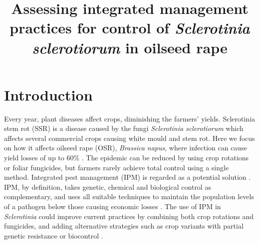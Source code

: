 \documentclass{article}
\title{\vspace*{-22mm}\bf Assessing integrated management practices for control of \textit{Sclerotinia sclerotiorum} in oilseed rape}
\date{}
\begin{document}
\linenumbers
\maketitle






\section{Introduction}
Every year, plant diseases affect crops, diminishing the farmers' yields. Sclerotinia stem rot (SSR) is a disease caused by the fungi \textit{Sclerotinia sclerotiorum} which affects several commercial crops causing white mould and stem rot. Here we focus on how it affects oilseed rape (OSR), \textit{Brassica napus}, where infection can cause yield losses of up to 60\% \cite{twengstrom:CropP:1998, rothmann:SAJC:2018}. The epidemic can be reduced by using crop rotations or foliar fungicides, but farmers rarely achieve total control using a single method. Integrated pest management (IPM) is regarded as a potential solution \cite{derbyshire:PP:2016}. IPM, by definition, takes genetic, chemical and biological control as complementary, and uses all suitable techniques to maintain the population levels of a pathogen below those causing economic losses \cite{Smith and Reynold 1966: Dent 1991, kogen:1998:ARE}. The use of IPM in \textit{Sclerotinia} could improve current practices by combining both crop rotations and fungicides, and adding alternative strategies such as crop variants with partial genetic resistance or biocontrol \cite{derbyshire:PP:2016}. 
\\
\end{document}
